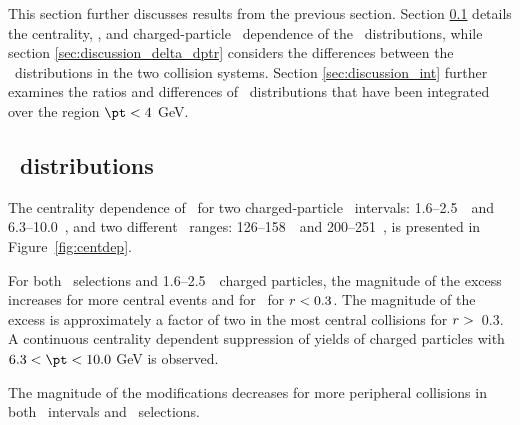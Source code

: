 
This section further discusses results from the previous section.
Section \ref{sec:discussion_Rdptr} details the centrality, \ptjet, and charged-particle \pt\ dependence of the \RDptr\ distributions, while section \ref{sec:discussion_delta_dptr} considers the differences between the \Dptr\ distributions in the two collision systems.
Section \ref{sec:discussion_int} further examines the ratios and differences of \Dptr\ distributions that have been integrated over the region $\pt < 4$ GeV.

\subsection{\RDptr\ distributions}
\label{sec:discussion_Rdptr}

The centrality dependence of \RDptr\ for two charged-particle \pt\ intervals: 1.6--2.5~\GeV\ and \mbox{6.3--10.0~\GeV}, and two different \ptjet\ ranges: 126--158~\GeV\ and 200--251~\GeV, is presented in Figure~\ref{fig:centdep}.

For both \ptjet\ selections and  1.6--2.5~\GeV\ charged particles, the magnitude of the excess increases for more central events and for \rvar\ for $\mbox{$r$} < 0.3$.
The magnitude of the excess is approximately a factor of two in the most central collisions for $\mbox{$r$} >$~0.3.
A continuous centrality dependent suppression of  yields of charged particles with $6.3 < \pt < 10.0$ GeV is observed.


The magnitude of the modifications decreases for more peripheral collisions in both \pt\ intervals and \ptjet\ selections.

